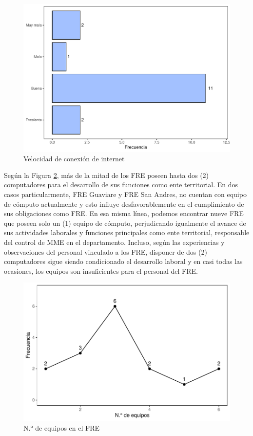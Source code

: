 \documentclass[
]{book}
\begin{document}
\begin{figure}
\includegraphics[width=0.85\linewidth]{InformeFinal_files/figure-latex/ConexionInternet-1} \caption{Velocidad de conexión de internet}\label{fig:ConexionInternet}
\end{figure}

Según la Figura \ref{fig:EquiposComputo}, más de la mitad de los FRE poseen hasta dos (2) computadores para el desarrollo de sus funciones como ente territorial. En dos casos particularmente, FRE Guaviare y FRE San Andres, no cuentan con equipo de cómputo actualmente y esto influye desfavorablemente en el cumplimiento de sus obligaciones como FRE. En esa misma línea, podemos encontrar nueve FRE que poseen solo un (1) equipo de cómputo, perjudicando igualmente el avance de sus actividades laborales y funciones principales como ente territorial, responsable del control de MME en el departamento. Incluso, según las experiencias y observaciones del personal vinculado a los FRE, disponer de dos (2) computadores sigue siendo condicionado el desarrollo laboral y en casi todas las ocasiones, los equipos son insuficientes para el personal del FRE.

\begin{figure}
\includegraphics[width=0.85\linewidth]{InformeFinal_files/figure-latex/EquiposComputo-1} \caption{N.° de equipos en el FRE}\label{fig:EquiposComputo}
\end{figure}
\end{document}
